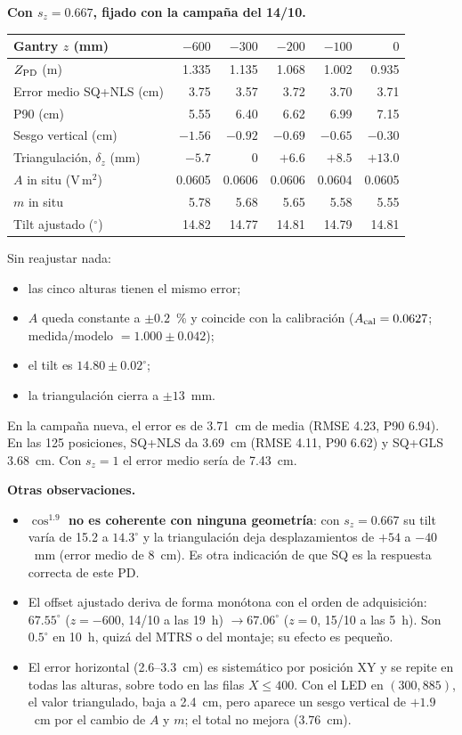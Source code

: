 \documentclass[11pt,a4paper]{article}
\begin{document}
\textbf{Con $s_z=0.667$, fijado con la campaña del 14/10.}
\begin{center}\small
\begin{tabular}{lrrrrr}\toprule
Gantry $z$ (mm) & $-600$ & $-300$ & $-200$ & $-100$ & $0$\\\midrule
$Z_{\rm PD}$ (m) & 1.335 & 1.135 & 1.068 & 1.002 & 0.935\\
Error medio SQ+NLS (cm) & 3.75 & 3.57 & 3.72 & 3.70 & 3.71\\
P90 (cm) & 5.55 & 6.40 & 6.62 & 6.99 & 7.15\\
Sesgo vertical (cm) & $-1.56$ & $-0.92$ & $-0.69$ & $-0.65$ & $-0.30$\\
Triangulación, $\delta_z$ (mm) & $-5.7$ & 0 & $+6.6$ & $+8.5$ & $+13.0$\\
$A$ in situ (V\,m$^2$) & 0.0605 & 0.0606 & 0.0606 & 0.0604 & 0.0605\\
$m$ in situ & 5.78 & 5.68 & 5.65 & 5.58 & 5.55\\
Tilt ajustado ($^\circ$) & 14.82 & 14.77 & 14.81 & 14.79 & 14.81\\\bottomrule
\end{tabular}\end{center}
Sin reajustar nada:
\begin{itemize}
\item las cinco alturas tienen el mismo error;
\item $A$ queda constante a $\pm0.2$~\% y coincide con la calibración ($A_{\rm cal}=0.0627$; medida/modelo $=1.000\pm0.042$);
\item el tilt es $14.80\pm0.02^\circ$;
\item la triangulación cierra a $\pm13$~mm.
\end{itemize}
En la campaña nueva, el error es de 3.71~cm de media (RMSE 4.23, P90 6.94). En las 125 posiciones, SQ+NLS da 3.69~cm (RMSE 4.11, P90 6.62) y SQ+GLS 3.68~cm. Con $s_z=1$ el error medio sería de 7.43~cm.

\textbf{Otras observaciones.}
\begin{itemize}
\item \textbf{$\cos^{1.9}$ no es coherente con ninguna geometría}: con $s_z=0.667$ su tilt varía de 15.2 a $14.3^\circ$ y la triangulación deja desplazamientos de $+54$ a $-40$~mm (error medio de 8~cm). Es otra indicación de que SQ es la respuesta correcta de este PD.
\item El offset ajustado deriva de forma monótona con el orden de adquisición: $67.55^\circ$ ($z=-600$, 14/10 a las 19~h) $\to 67.06^\circ$ ($z=0$, 15/10 a las 5~h). Son $0.5^\circ$ en 10~h, quizá del MTRS o del montaje; su efecto es pequeño.
\item El error horizontal (2.6--3.3~cm) es sistemático por posición XY y se repite en todas las alturas, sobre todo en las filas $X\le400$. Con el LED en $(300,885)$, el valor triangulado, baja a 2.4~cm, pero aparece un sesgo vertical de $+1.9$~cm por el cambio de $A$ y $m$; el total no mejora (3.76~cm).
\end{itemize}
\end{document}
